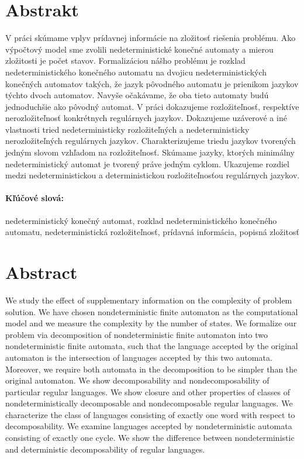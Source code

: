 \documentclass[12pt, oneside]{book}
\begin{document}

\newpage 
\section*{Abstrakt}

V práci skúmame vplyv prídavnej informácie na zložitosť riešenia problému. Ako výpočtový model sme zvolili nedeterministické konečné automaty a mierou zložitosti je počet stavov. Formalizáciou nášho problému je rozklad nedeterministického konečného automatu na dvojicu nedeterministických konečných automatov takých, že jazyk pôvodného automatu je prienikom jazykov týchto dvoch automatov. Navyše očakávame, že oba tieto automaty budú jednoduchšie ako pôvodný automat. V práci dokazujeme rozložiteľnosť, respektíve nerozložiteľnosť konkrétnych regulárnych jazykov. Dokazujeme uzáverové a iné vlastnosti tried nedeterministicky rozložiteľných a nedeterministicky nerozložiteľných regulárnych jazykov. Charakterizujeme triedu jazykov tvorených jedným slovom vzhľadom na rozložiteľnosť. Skúmame jazyky, ktorých minimálny nedeterministický automat je tvorený práve jedným cyklom. Ukazujeme rozdiel medzi nedeterministickou a deterministickou rozložiteľnosťou regulárnych jazykov.

\paragraph*{Kľúčové slová:} nedeterministický konečný automat, rozklad nedeterministického konečného automatu, nedeterministická rozložiteľnosť, prídavná informácia, popisná zložitosť


\newpage 
\section*{Abstract}

We study the effect of supplementary information on the complexity of problem solution. We have chosen nondeterministic finite automaton as the computational model and we measure the complexity by the number of states. We formalize our problem via decomposition of nondeterministic finite automaton into two nondeterministic finite automata, such that the language accepted by the original automaton is the intersection of languages accepted by this two automata. Moreover, we require both automata in the decomposition to be simpler than the original automaton. We show decomposability and nondecomposability of particular regular languages. We show closure and other properties of classes of nondeterministically decomposable and nondecomposable regular languages. We characterize the class of languages consisting of exactly one word with respect to decomposability. We examine languages accepted by nondeterministic automata consisting of exactly one cycle. We show the difference between nondeterministic and deterministic decomposability of regular languages.
\end{document}
